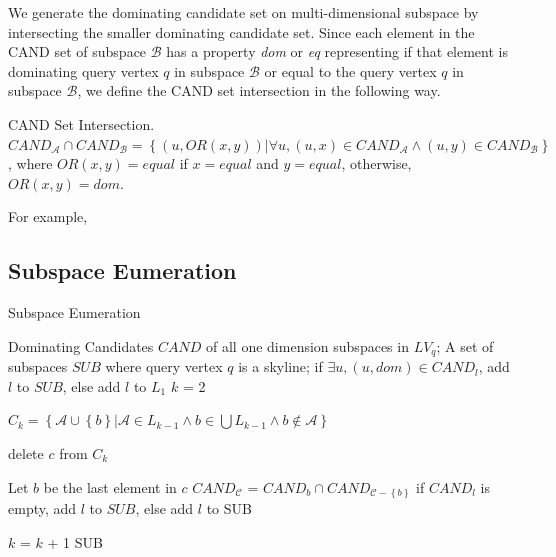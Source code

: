 We generate the dominating candidate set on multi-dimensional subspace by intersecting the smaller dominating candidate set. Since each element in the CAND set of subspace $\mathcal{B}$ has a property \emph{dom} or \emph{eq} representing if that element is dominating query vertex $q$ in subspace $\mathcal{B}$ or equal to the query vertex $q$ in subspace $\mathcal{B}$, we define the CAND set intersection in the following way.

\begin{definition}
CAND Set Intersection. $\mathit{CAND}_\mathcal{A} \cap \mathit{CAND}_\mathcal{B} = \left\{(u, OR(x, y)) |\forall u, (u, x)\in \mathit{CAND}_\mathcal{A} \wedge (u, y)\in \mathit{CAND}_\mathcal{B} \right\}$, where $OR(x, y) = equal$ if $x = equal$ and $y = equal$, otherwise, $OR(x, y) = dom$.
\end{definition}

For example, 


\subsection{Subspace Eumeration}
\begin{algorithm}[H]
  \caption{Subspace Eumeration}\label{algo:blah}
    \begin{algorithmic}[1]
  \show\LOOP
    \REQUIRE Dominating Candidates $\mathit{CAND}$ of all one dimension subspaces in $LV_q$;
    \ENSURE A set of subspaces $SUB$ where query vertex $q$ is a skyline;
            \STATE if $\exists u, (u, dom)\in \mathit{CAND}_l$, add $l$ to $SUB$, else add $l$ to $L_1$
        \ENDFOR
        \STATE $k$ = 2
        
        
            \STATE $C_k = \left\{\mathcal{A} \cup \left\{b\right\} | \mathcal{A} \in L_{k-1} \wedge b \in \bigcup L_{k-1} \wedge b \notin \mathcal{A} \right\}$
            
                    \STATE delete $c$ from $C_k$
                    
                \ENDIF
            \ENDFOR
            
                \STATE Let $b$ be the last element in $c$
                \STATE $CAND_\mathcal{C}$ = $CAND_b \cap CAND_{\mathcal{C}-\left\{b\right\}}$
                \STATE if $CAND_l$ is empty, add $l$ to $SUB$, else add $l$ to SUB
            \ENDFOR
            
            \STATE $k$ = $k$ + 1
        \ENDWHILE
        \RETURN SUB
  \end{algorithmic}
\end{algorithm}

